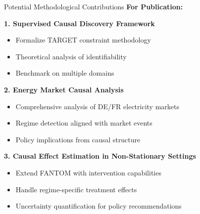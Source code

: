 \documentclass[aspectratio=169]{beamer}
\begin{document}
\begin{frame}{Potential Methodological Contributions}
\textbf{For Publication:}

\vspace{0.3cm}
\textbf{1. Supervised Causal Discovery Framework}
\begin{itemize}
    \item Formalize TARGET constraint methodology
    \item Theoretical analysis of identifiability
    \item Benchmark on multiple domains
\end{itemize}

\vspace{0.3cm}
\textbf{2. Energy Market Causal Analysis}
\begin{itemize}
    \item Comprehensive analysis of DE/FR electricity markets
    \item Regime detection aligned with market events
    \item Policy implications from causal structure
\end{itemize}

\vspace{0.3cm}
\textbf{3. Causal Effect Estimation in Non-Stationary Settings}
\begin{itemize}
    \item Extend FANTOM with intervention capabilities
    \item Handle regime-specific treatment effects
    \item Uncertainty quantification for policy recommendations
\end{itemize}
\end{frame}
\end{document}
